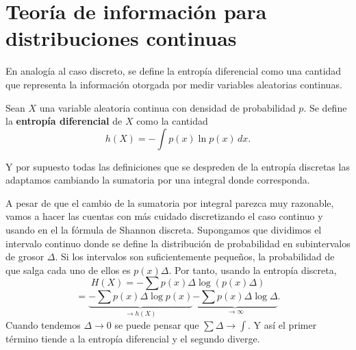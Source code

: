 \section{Teor\'ia de informaci\'on para distribuciones continuas}
En analog\'ia al caso discreto, se define la entrop\'ia diferencial como una cantidad que representa la informaci\'on otorgada por medir variables aleatorias continuas.
\begin{definition}
    Sean $X$ una variable aleatoria continua con densidad de probabilidad $p$. Se define la {\bf entrop\'ia diferencial} de $X$ como la cantidad
    \begin{equation}
        h(X) = - \int p(x) \ln p(x)\, dx.
    \end{equation}
\end{definition}
Y por supuesto todas las definiciones que se despreden de la entrop\'ia discretas las adaptamos cambiando la sumatoria por una integral donde corresponda.

A pesar de que el cambio de la sumatoria por integral parezca muy razonable, vamos a hacer las cuentas con m\'as cuidado discretizando el caso continuo y usando en el la f\'ormula de Shannon discreta. Supongamos que dividimos el intervalo continuo donde se define la distribuci\'on de probabilidad en subintervalos de grosor $\Delta$. Si los intervalos son suficientemente pequeños, la probabilidad de que salga cada uno de ellos es $p(x)\Delta$. Por tanto, usando la entrop\'ia discreta,
$$
    H(X) = -\sum p(x)\Delta \log (p(x)\Delta)
$$
$$
     = \underbrace{-\sum p(x)\Delta \log p(x)}_{\to h(X)} \underbrace{-\sum p(x)\Delta \log \Delta}_{\to \infty}.
$$
Cuando tendemos $\Delta\to 0$ se puede pensar que $\sum \Delta \to \int$. Y as\'i el primer t\'ermino tiende a la entrop\'ia diferencial y el segundo diverge.

